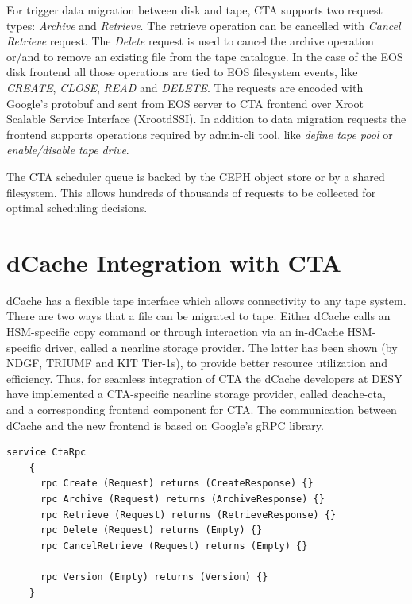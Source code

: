 \documentclass{webofc}
\begin{document}
For trigger data migration between disk and tape, CTA supports two request types: \textit{Archive} and \textit{Retrieve}. The retrieve operation can be cancelled with \textit{Cancel Retrieve} request. The \textit{Delete} request is used to cancel the archive operation or/and to remove an existing file from the tape catalogue. In the case of the EOS disk frontend all those operations are tied to EOS filesystem events, like \textit{CREATE}, \textit{CLOSE}, \textit{READ} and \textit{DELETE}. The requests are encoded with Google's protobuf \cite{prtobuf} and sent from EOS server to CTA frontend over Xroot Scalable Service Interface (XrootdSSI). In addition to data migration requests the frontend supports operations required by admin-cli tool, like \textit{define tape pool} or \textit{enable/disable tape drive}.

The CTA scheduler queue is backed by the CEPH object store or by a shared filesystem. This allows hundreds of thousands of requests to be collected for optimal scheduling decisions.

\section{dCache Integration with CTA}
\label{sec:integration}

dCache has a flexible tape interface which allows connectivity to any tape system. There are two ways that a file can be migrated to tape. Either dCache calls an HSM-specific copy command or through interaction via an in-dCache HSM-specific driver, called a nearline storage provider. The latter has been shown (by NDGF, TRIUMF and KIT Tier-1s), to provide better resource utilization and efficiency\cite{endit_kit}. Thus, for seamless integration of CTA the dCache developers at DESY have implemented a CTA-specific nearline storage provider, called dcache-cta\cite{dcache_cta}, and a corresponding frontend component for CTA. The communication between dCache and the new frontend is based on Google’s gRPC library.

\begin{lstlisting}[label=grpc-frontend,caption={gRPC service definition},keywords={service,rpc,returns}]
    service CtaRpc
    {
      rpc Create (Request) returns (CreateResponse) {}
      rpc Archive (Request) returns (ArchiveResponse) {}
      rpc Retrieve (Request) returns (RetrieveResponse) {}
      rpc Delete (Request) returns (Empty) {}
      rpc CancelRetrieve (Request) returns (Empty) {}
    
      rpc Version (Empty) returns (Version) {}
    }
\end{lstlisting}
\end{document}
